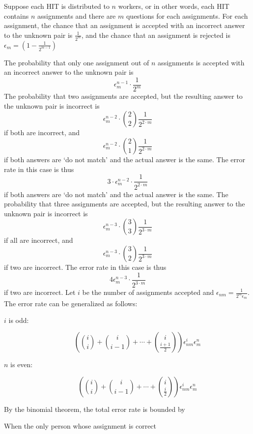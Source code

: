 Suppose each HIT is distributed to $n$ workers, or in other words, each HIT
contains $n$ assignments and there are $m$ questions for each assignments.  For
each assignment, the chance that an assignment is accepted with an incorrect
answer to the unknown pair is $\frac{1}{2^m}$, and the chance that an assignment
is rejected is $\epsilon_m = (1-\frac{1}{2^{m-1}})$

The probability that only one assignment out of $n$ assignments is accepted with
an incorrect answer to the unknown pair is
$$\epsilon_m^{n-1} \cdot \frac{1}{2^m}$$
The probability that two assignments are accepted, but the resulting answer to
the unknown pair is incorrect is
$$\epsilon_m^{n-2} \cdot \binom{2}{2}\frac{1}{2^{2\cdot m}}$$
if both are incorrect, and
$$\epsilon_m^{n-2} \cdot \binom{2}{1}\frac{1}{2^{2\cdot m}}$$
if both answers are `do not match' and the actual answer is the same.
The error rate in this case is thus
$$3 \cdot \epsilon_m^{n-2} \cdot \frac{1}{2^{2\cdot m}}$$
if both answers are `do not match' and the actual answer is the same.
The probability that three assignments are accepted, but the resulting answer to
the unknown pair is incorrect is
$$\epsilon_m^{n-3} \cdot \binom{3}{3}\frac{1}{2^{3\cdot m}}$$
if all are incorrect, and
$$\epsilon_m^{n-3} \cdot \binom{3}{2}\frac{1}{2^{3\cdot m}}$$
if two are incorrect.
The error rate in this case is thus
$$4 \epsilon_m^{n-3} \cdot \frac{1}{2^{3\cdot m}}$$
if two are incorrect.
Let $i$ be the number of assignments accepted and
$\epsilon_{nm} = \frac{1}{2^m\epsilon_m}$.
The error rate can be generalized as follows:
\begin{description}
  \item[$i$ is odd:]
  $$(\binom{i}{i} + \binom{i}{i-1} + \cdots +
  \binom{i}{\frac{i+1}{2}})\epsilon_{nm}^i \epsilon_m^n$$
  \item[$n$ is even:]
  $$(\binom{i}{i} + \binom{i}{i-1} + \cdots +
  \binom{i}{\frac{i}{2}})\epsilon_{nm}^i \epsilon_m^n$$
\end{description}
By the binomial theorem, the total error rate is bounded by

When the only person whose assignment is correct